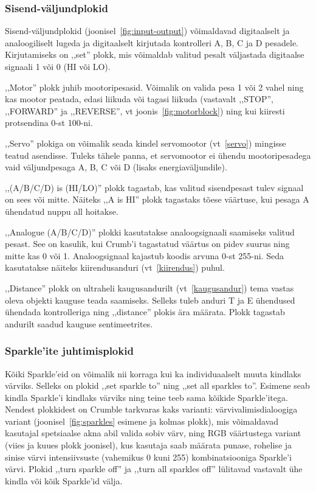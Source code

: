 \documentclass[12pt]{article}
\begin{document}
\subsubsection{Sisend-väljundplokid}


Sisend-väljundplokid (joonisel~\ref{fig:input-output}) võimaldavad digitaalselt ja analoogiliselt lugeda ja digitaalselt kirjutada kontrolleri A, B, C ja D pesadele. Kirjutamiseks on ,,set'' plokk, mis võimaldab valitud pesalt väljastada digitaalse signaali 1 või 0 (HI või LO). 



,,Motor'' plokk juhib mootoripesasid. Võimalik on valida pesa 1 või 2 vahel ning kas mootor peatada, edasi liikuda või tagasi liikuda (vastavalt ,,STOP'', ,,FORWARD'' ja ,,REVERSE'', vt joonis~\ref{fig:motorblock}) ning kui kiiresti protsendina 0-st 100-ni.

,,Servo'' plokiga on võimalik seada kindel servomootor (vt~\ref{servo}) mingisse teatud asendisse. Tuleks tähele panna, et servomootor ei ühendu mootoripesadega vaid väljundpesaga A, B, C või D (lisaks energiaväljundile).

,,(A/B/C/D) is (HI/LO)'' plokk tagastab, kas valitud sisendpesast tulev signaal on sees või mitte. Näiteks ,,A is HI'' plokk tagastaks tõese väärtuse, kui pesaga A ühendatud nuppu all hoitakse.

,,Analogue (A/B/C/D)'' plokki kasutatakse analoogsignaali saamiseks valitud pesast. See on kasulik, kui Crumb’i tagastatud väärtus on pidev suurus ning mitte kas 0 või 1. Analoogsignaal kajastub koodis arvuna 0-st 255-ni. Seda kasutatakse näiteks kiirendusanduri (vt~\ref{kiirendus}) puhul.

,,Distance'' plokk on ultraheli kaugusandurilt (vt~\ref{kaugusandur}) tema vastas oleva objekti kauguse teada saamiseks. Selleks tuleb anduri T ja E ühendused ühendada kontrolleriga ning ,,distance'' plokis ära määrata. Plokk tagastab andurilt saadud kauguse sentimeetrites.

\subsubsection{Sparkle'ite juhtimisplokid}


Kõiki Sparkle’eid on võimalik nii korraga kui ka individuaalselt muuta kindlaks värviks. Selleks on plokid ,,set sparkle to'' ning ,,set all sparkles to''. Esimene seab kindla Sparkle’i kindlaks värviks ning teine teeb sama kõikide Sparkle’itega. Nendest plokkidest on Crumble tarkvaras kaks varianti: värvivalimisdialoogiga variant (joonisel~\ref{fig:sparkles} esimene ja kolmas plokk), mis võimaldavad kasutajal spetsiaalse akna abil valida sobiv värv, ning RGB väärtustega variant (viies ja kuues plokk joonisel), kus kasutaja saab määrata punase, rohelise ja sinise värvi intensiivsuste (vahemikus 0 kuni 255) kombinatsiooniga Sparkle’i värvi. Plokid ,,turn sparkle off'' ja ,,turn all sparkles off'' lülitavad vastavalt ühe kindla või kõik Sparkle’id välja.
\end{document}
